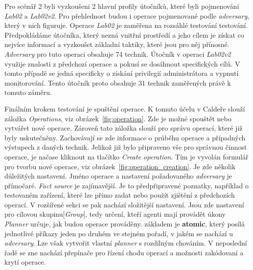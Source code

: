 Pro scénář 2 byli vyzkoušeni 2 hlavní profily útočníků, které byli pojmenováni \textit{Lab02} a \textit{Lab02v2}.
Pro přehlednost budou i operace pojmenované podle \textit{adversary}, který v nich figuruje.
Operace \textit{Lab02} je zaměřena na rozsáhlé testování testování.
Předpokládáme útočníka, který nezná vnitřní prostředí a jeho cílem je získat co nejvíce informací a vyzkoušet základní taktiky, které jsou pro něj přínosné.
\textit{Adversary} pro tuto operaci obsahuje 74 technik.
Útočník v operaci \textit{Lab02v2} využije znalosti z předchozí operace a pokusí se dosáhnout specifických cílů.
V tomto případě se jedná specificky o získání privilegií administrátora a vypnutí monitorování.
Tento útočník proto obsahuje 31 technik zaměřených právě k tomuto záměru.


Finálním krokem testování je spuštění operace.
K tomuto účelu v Caldeře slouží záložka \textit{Operations}, viz obrázek~\ref{fig:operation}.
Zde je možné spouštět nebo vytvářet nové operace.
Zároveň tato záložka slouží pro správu operací, které již byly uskutečněny.
Zachovávají se zde informace o průběhu operace a případných výstupech z daných technik.
Jelikož již bylo připraveno vše pro správnou činnost operace, je načase kliknout na tlačítko \textit{Create operation}.
Tím je vyvolán formulář pro tvorbu nové operace, viz obrázek~\ref{fig:operation_creation}.
Je zde několik důležitých nastavení.
Jméno operace a nastavení požadovaného \textit{adversary} je přímočaré.
\textit{Fact source} je zajímavější.
Je to předpřipravené poznatky, například o testovaném zařízení, které lze přímo zadat nebo použít zjištění z předchozích operací.
V rozšířené sekci se pak nachází složitější nastavení.
Jsou zde nastavení pro cílovou skupinu[\textit{Group}], tedy určení, kteří agenti mají provádět úkony
\textit{Planner} určuje, jak budou operace prováděny.
základem je \textbf{atomic}, který posílá jednotlivé příkazy jeden po druhém ve stejném pořadí, v jakém se nachází u \textit{adversary}.
Lze však vytvořit vlastní \textit{planner} s rozdílným chováním\cite{mitre_caldera_docs}.
V neposlední řadě se zne nachází přepínače pro řízení chodu operací a možnosti zakódovaní a krytí operace.

